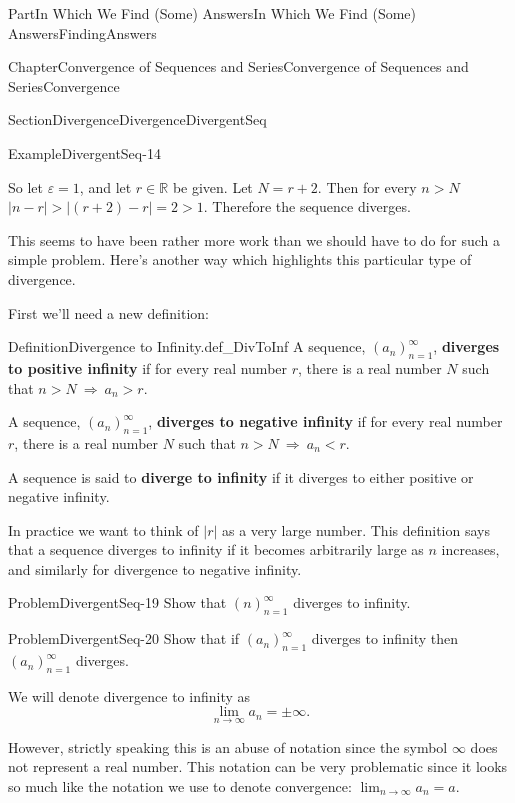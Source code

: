 \documentclass[oneside,10pt,]{book}
\newcommand{\terminology}[1]{\textbf{#1}}
\numberwithin{equation}{part}
\newcommand{\imp}{\ \Rightarrow\ }
\newcommand{\abs}[1]{\left|#1\right|}
\def\limit#1#2#3{{\displaystyle\lim_{#1\rightarrow #2}#3}}
\newcommand{\eps}{\varepsilon}
\newcommand{\RR}{\mathbb {R}}
\newcommand{\lt}{<}
\begin{document}
\begin{partptx}{Part}{In Which We Find (Some) Answers}{}{In Which We Find (Some) Answers}{}{}{FindingAnswers}
\begin{chapterptx}{Chapter}{Convergence of Sequences and Series}{}{Convergence of Sequences and Series}{}{}{Convergence}
\begin{sectionptx}{Section}{Divergence}{}{Divergence}{}{}{DivergentSeq}
\begin{example}{Example}{}{DivergentSeq-14}
\par
So let \(\eps=1\), and let \(r\in\RR\) be given. Let \(N=r+2\). Then for every \(n>N\) \(\abs{n-r} > \abs{(r+2)-r}=2>1\). Therefore the sequence diverges.%
\end{example}
This seems to have been rather more work than we should have to do for such a simple problem. Here's another way which highlights this particular type of divergence.%
\par
First we'll need a new definition:%
\begin{definition}{Definition}{Divergence to Infinity.}{def_DivToInf}%
 A sequence, \(\left(a_n\right)_{n=1}^\infty\), \terminology{diverges to positive infinity} if for every real number \(r\), there is a real number \(N\) such that \(n>N\imp a_n>r\).%
\par
{} A sequence, \(\left(a_n\right)_{n=1}^\infty\), \terminology{diverges to negative infinity} if for every real number \(r\), there is a real number \(N\) such that \(n>N\imp a_n\lt r\).%
\par
{} A sequence is said to \terminology{diverge to infinity} if it diverges to either positive or negative infinity.%
\end{definition}
In practice we want to think of \(\abs{r}\) as a very large number. This definition says that a sequence diverges to infinity if it becomes arbitrarily large as \(n\) increases, and similarly for divergence to negative infinity.%
\begin{problem}{Problem}{}{DivergentSeq-19}%
 Show that \(\left(n\right)_{n=1}^\infty\) diverges to infinity.%
\end{problem}
\begin{problem}{Problem}{}{DivergentSeq-20}%
 Show that if \(\left(a_n\right)_{n=1}^\infty\) diverges to infinity then \(\left(a_n\right)_{n=1}^\infty\) diverges.%
\end{problem}
We will denote divergence to infinity as%
\begin{equation*}
\limit{n}{\infty}{a_n}=\pm\infty\text{.}
\end{equation*}
%
\par
However, strictly speaking this is an abuse of notation since the symbol \(\infty\) does not represent a real number. This notation can be very problematic since it looks so much like the notation we use to denote convergence: \(\limit{n}{\infty}{a_n}=a\).%

\end{sectionptx}
\end{chapterptx}
\end{partptx}
\end{document}
